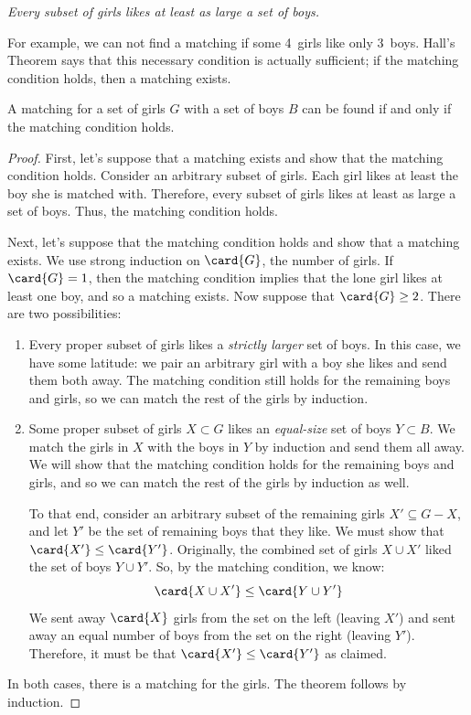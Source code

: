 \bigskip
\centerline{{\em Every subset of girls likes at least as large a set of boys.}}
\bigskip

For example, we can not find a matching if some 4~girls
like only 3~boys.  Hall's Theorem says that this necessary
condition is actually sufficient; if the matching condition holds,
then a matching exists.

\begin{theorem}
A matching for a set of girls $G$ with a set of boys $B$ can be found if
and only if the matching condition holds.
\end{theorem}

\begin{proof}
First, let's suppose that a matching exists and show that the matching
condition holds.  Consider an arbitrary subset of girls.  Each girl likes
at least the boy she is matched with.  Therefore, every subset of girls
likes at least as large a set of boys.  Thus, the matching condition
holds.

Next, let's suppose that the matching condition holds and show that a
matching exists.  We use strong induction on $\card{G}$, the number of
girls.  If $\card{G} = 1$, then the matching condition implies that the
lone girl likes at least one boy, and so a matching exists.  Now suppose
that $\card{G} \geq 2$.  There are two possibilities:

\begin{enumerate}

\item Every proper subset of girls likes a {\em strictly larger} set of
boys.  In this case, we have some latitude: we pair an arbitrary girl
with a boy she likes and send them both away.  The matching condition
still holds for the remaining boys and girls, so we can match the rest
of the girls by induction.

\item Some proper subset of girls $X \subset G$ likes an {\em equal-size}
set of boys $Y \subset B$.  We match the girls in $X$ with the boys in
$Y$ by induction and send them all away.  We will show that the
matching condition holds for the remaining boys and girls, and so we
can match the rest of the girls by induction as well.

To that end, consider an arbitrary subset of the remaining girls $X'
\subseteq G - X$, and let $Y'$ be the set of remaining boys that they
like.  We must show that $\card{X'} \leq \card{Y'}$.  Originally, the
combined set of girls $X \cup X'$ liked the set of boys $Y \cup Y'$.
So, by the matching condition, we know:
%
\[
\card{X \cup X'}  \leq  \card{Y \cup Y'}
\]
%
We sent away $\card{X}$ girls from the set on the left (leaving $X'$)
and sent away an equal number of boys from the set on the right
(leaving $Y'$).  Therefore, it must be that $\card{X'}
\leq \card{Y'}$ as claimed.

\end{enumerate}

In both cases, there is a matching for the girls.  The theorem follows
by induction.
\end{proof}

